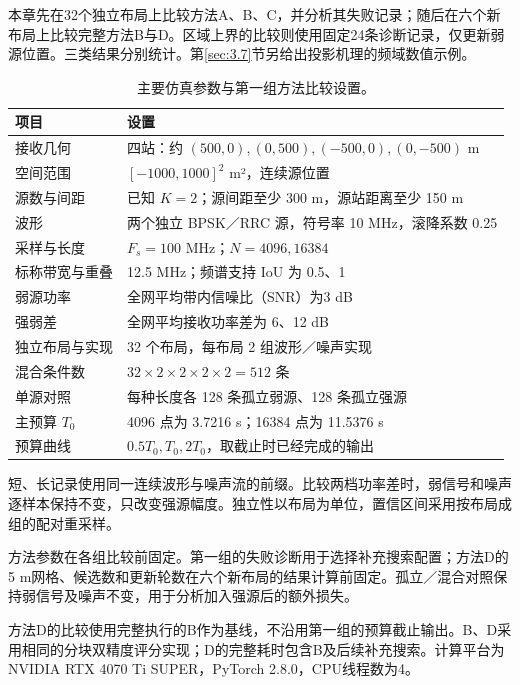 \documentclass[11pt,a4paper]{article}
\numberwithin{equation}{section}
\numberwithin{figure}{section}
\numberwithin{table}{section}
\begin{document}
本章先在32个独立布局上比较方法A、B、C，并分析其失败记录；随后在六个新布局上比较完整方法B与D。区域上界的比较则使用固定24条诊断记录，仅更新弱源位置。三类结果分别统计。第\ref{sec:3.7}节另给出投影机理的频域数值示例。

\begin{table}[!htbp]
\centering
\caption{主要仿真参数与第一组方法比较设置。}\label{tab:3.1}
\small
\setlength{\tabcolsep}{4pt}
\renewcommand{\arraystretch}{1.2}
\begin{tabularx}{\linewidth}{Y{0.65}Y{1.35}}
\toprule
\textbf{项目} & \textbf{设置} \\
\midrule
接收几何 & 四站：约 $(500,0),(0,500),(-500,0),(0,-500)$ m \\
空间范围 & $[-1000,1000]^2$ m²，连续源位置 \\
源数与间距 & 已知 $K=2$；源间距至少 300 m，源站距离至少 150 m \\
波形 & 两个独立 BPSK／RRC 源，符号率 10 MHz，滚降系数 0.25 \\
采样与长度 & $F_s=100$ MHz；$N=4096,16384$ \\
标称带宽与重叠 & 12.5 MHz；频谱支持 IoU 为 0.5、1 \\
弱源功率 & 全网平均带内信噪比（SNR）为3 dB \\
强弱差 & 全网平均接收功率差为 6、12 dB \\
独立布局与实现 & 32 个布局，每布局 2 组波形／噪声实现 \\
混合条件数 & $32\times2\times2\times2\times2=512$ 条 \\
单源对照 & 每种长度各 128 条孤立弱源、128 条孤立强源 \\
主预算 $T_0$ & 4096 点为 3.7216 s；16384 点为 11.5376 s \\
预算曲线 & $0.5T_0,T_0,2T_0$，取截止时已经完成的输出 \\
\bottomrule
\end{tabularx}
\end{table}

短、长记录使用同一连续波形与噪声流的前缀。比较两档功率差时，弱信号和噪声逐样本保持不变，只改变强源幅度。独立性以布局为单位，置信区间采用按布局成组的配对重采样。

方法参数在各组比较前固定。第一组的失败诊断用于选择补充搜索配置；方法D的5 m网格、候选数和更新轮数在六个新布局的结果计算前固定。孤立／混合对照保持弱信号及噪声不变，用于分析加入强源后的额外损失。

方法D的比较使用完整执行的B作为基线，不沿用第一组的预算截止输出。B、D采用相同的分块双精度评分实现；D的完整耗时包含B及后续补充搜索。计算平台为NVIDIA RTX 4070 Ti SUPER，PyTorch 2.8.0，CPU线程数为4。
\end{document}
